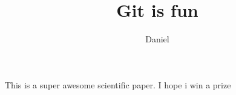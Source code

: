 \documentclass[10pt]{article}
\author{Daniel}
\title{Git is fun}
\begin{document}
	\maketitle

	This is a super awesome scientific paper.
	I hope i win a prize
\end{document}
